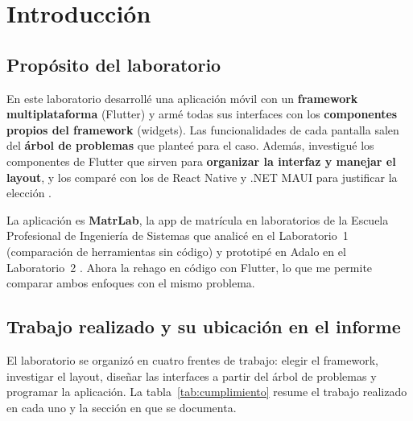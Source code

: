 \section{Introducción}
\label{sec:objetivo}

\subsection{Propósito del laboratorio}
En este laboratorio desarrollé una aplicación móvil con un \textbf{framework multiplataforma} (Flutter) y armé todas sus interfaces con los \textbf{componentes propios del framework} (widgets). Las funcionalidades de cada pantalla salen del \textbf{árbol de problemas} que planteé para el caso. Además, investigué los componentes de Flutter que sirven para \textbf{organizar la interfaz y manejar el layout}, y los comparé con los de React Native y .NET MAUI para justificar la elección \cite{guia04}.

La aplicación es \textbf{MatrLab}, la app de matrícula en laboratorios de la Escuela Profesional de Ingeniería de Sistemas que analicé en el Laboratorio~1 (comparación de herramientas sin código) y prototipé en Adalo en el Laboratorio~2 \cite{lab1,lab2}. Ahora la rehago en código con Flutter, lo que me permite comparar ambos enfoques con el mismo problema.

\subsection{Trabajo realizado y su ubicación en el informe}
El laboratorio se organizó en cuatro frentes de trabajo: elegir el framework, investigar el layout, diseñar las interfaces a partir del árbol de problemas y programar la aplicación. La tabla~\ref{tab:cumplimiento} resume el trabajo realizado en cada uno y la sección en que se documenta.

